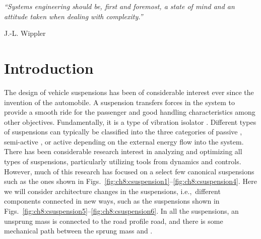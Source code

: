 

\epigraph{\textit{``Systems engineering should be, first and foremost, a state of mind and an attitude taken when dealing with complexity.''}}{\textmd{J.-L. Wippler} \cite[p.~208]{Luzeaux2013a}}

\section{Introduction\label{sec:ch8:introduction}}

The design of vehicle suspensions has been of considerable interest ever since the invention of the automobile.
A suspension transfers forces in the system to provide a smooth ride for the passenger and good handling characteristics among other objectives.
Fundamentally, it is a type of vibration isolator \cite{Kasturi1998a, Hrovat1997a, Hrovat1993a}.
Different types of suspensions can typically be classified into the three categories of passive \cite{Kasturi1998a, Gobbi2001a, He2005a, Allison2008b, Hrovat1997a, Hrovat1993a}, semi-active \cite{Deshmukh2015a, Koch2014a, Hrovat1993a, Bourmistrova2005a}, or active \cite{Fathy2003a, Alyaqout2007b, Allison2014b, Hrovat1997a, Ulsoy1994a, Hrovat1993a} depending on the external energy flow into the system. 
There has been considerable research interest in analyzing and optimizing all types of suspensions, particularly utilizing tools from dynamics and controls.
However, much of this research has focused on a select few canonical suspensions such as the ones shown in Figs.~\ref{fig:ch8:csuspension1}--\ref{fig:ch8:csuspension4}. 
Here we will consider architecture changes in the suspensions, i.e.,~different components connected in new ways, such as the suspensions shown in Figs.~\ref{fig:ch8:csuspension5}--\ref{fig:ch8:csuspension6}.
In all the suspensions, an unsprung mass  is connected to the road profile \gls{road}, and there is some mechanical path between the sprung mass  and .


